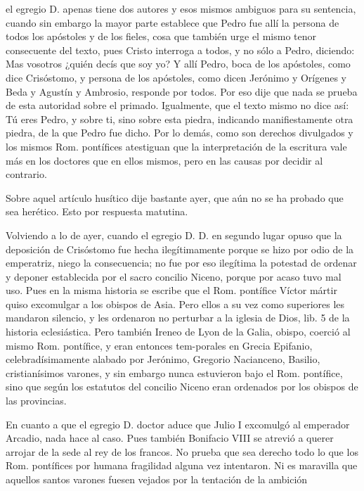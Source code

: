 el egregio D. apenas tiene dos autores y esos mismos ambiguos para su sentencia, cuando sin embargo la mayor parte establece que Pedro fue allí la persona de todos los apóstoles y de los fieles, cosa que también urge el mismo tenor consecuente del texto, pues Cristo interroga a todos, y no sólo a Pedro, diciendo: Mas vosotros ¿quién decís que soy yo? Y allí Pedro, boca de los apóstoles, como dice Crisóstomo, y persona de los apóstoles, como dicen Jerónimo y Orígenes y Beda y Agustín y Ambrosio, responde por todos. Por eso dije que nada se prueba de esta autoridad sobre el primado. Igualmente, que el texto mismo no dice así: Tú eres Pedro, y sobre ti, sino sobre esta piedra, indicando manifiestamente otra piedra, de la que Pedro fue dicho. Por lo demás, como son derechos divulgados y los mismos Rom. pontífices atestiguan que la interpretación de la escritura vale más en los doctores que en ellos mismos, pero en las causas por decidir al contrario.

Sobre aquel artículo husítico dije bastante ayer, que aún no se ha probado que sea herético. Esto por respuesta matutina.

Volviendo a lo de ayer, cuando el egregio D. D. en segundo lugar opuso que la deposición de Crisóstomo fue hecha ilegítimamente porque se hizo por odio de la emperatriz, niego la consecuencia; no fue por eso ilegítima la potestad de ordenar y deponer establecida por el sacro concilio Niceno, porque por acaso tuvo mal uso. Pues en la misma historia se escribe que el Rom. pontífice Víctor mártir quiso excomulgar a los obispos de Asia. Pero ellos a su vez como superiores les mandaron silencio, y les ordenaron no perturbar a la iglesia de Dios, lib. 5 de la historia eclesiástica. Pero también Ireneo de Lyon de la Galia, obispo, coerció al mismo Rom. pontífice, y eran entonces tem-\marginpar{\small[300]}porales en Grecia Epifanio, celebradísimamente alabado por Jerónimo, Gregorio Nacianceno, Basilio, cristianísimos varones, y sin embargo nunca estuvieron bajo el Rom. pontífice, sino que según los estatutos del concilio Niceno eran ordenados por los obispos de las provincias.

En cuanto a que el egregio D. doctor aduce que Julio I excomulgó al emperador Arcadio, nada hace al caso. Pues también Bonifacio VIII se atrevió a querer arrojar de la sede al rey de los francos. No prueba que sea derecho todo lo que los Rom. pontífices por humana fragilidad alguna vez intentaron. Ni es maravilla que aquellos santos varones fuesen vejados por la tentación de la ambición

